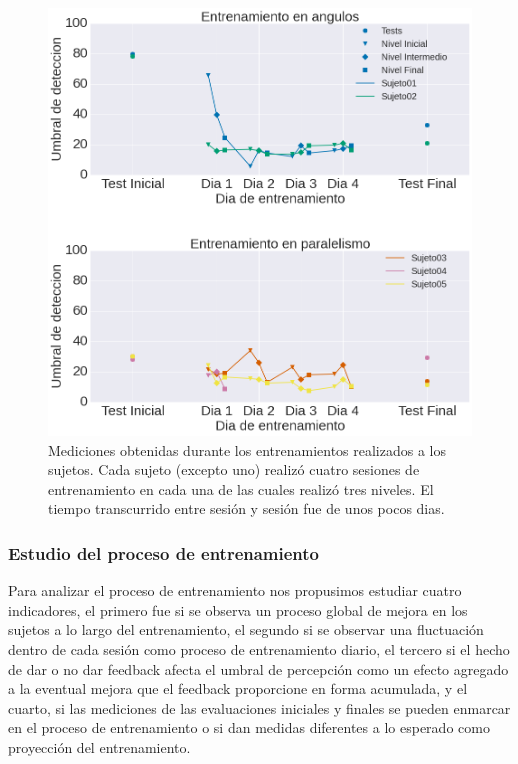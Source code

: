 \documentclass{article}
\begin{document}
    
    \begin{figure}
        \center
        \includegraphics[width=\textwidth]{Imagenes/TransferenciaEntrenamientoNuevo.png}
        \caption{Mediciones obtenidas durante los entrenamientos realizados a los sujetos. Cada sujeto (excepto uno) realizó cuatro sesiones de entrenamiento en cada una de las cuales realizó tres niveles. El tiempo transcurrido entre sesión y sesión fue de unos pocos dias.}
        \label{fig:Exp2_Entrenamiento}
    \end{figure}  


    \subsubsection{Estudio del proceso de entrenamiento}
    
    Para analizar el proceso de entrenamiento nos propusimos estudiar cuatro indicadores, el primero fue si se observa un proceso global de mejora en los sujetos a lo largo del entrenamiento, el segundo si se observar una fluctuación dentro de cada sesión como proceso de entrenamiento diario, el tercero si el hecho de dar o no dar feedback afecta el umbral de percepción como un efecto agregado a la eventual mejora que el feedback proporcione en forma acumulada, y el cuarto, si las mediciones de las evaluaciones iniciales y finales se pueden enmarcar en el proceso de entrenamiento o si dan medidas diferentes a lo esperado como proyección del entrenamiento. 
    
\end{document}
